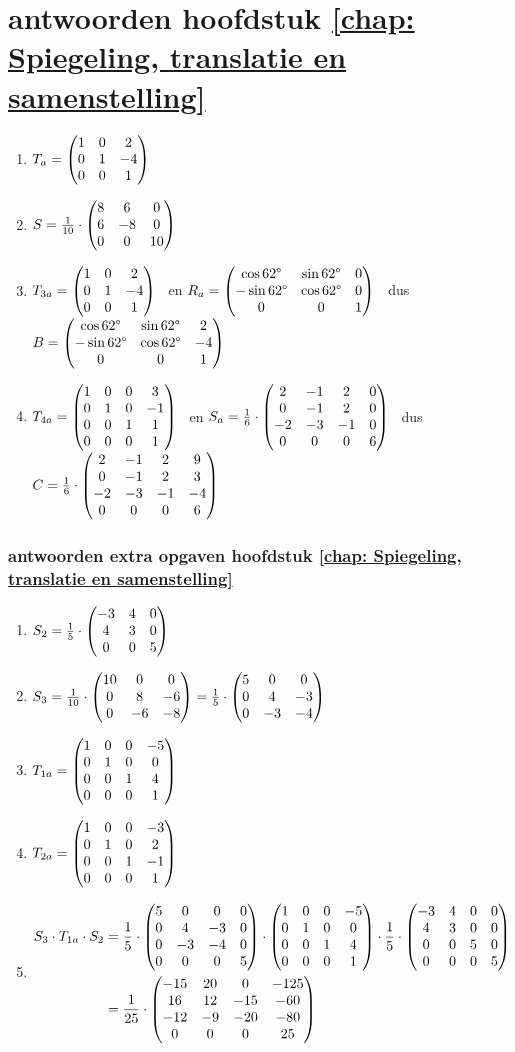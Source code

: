 \section{antwoorden  hoofdstuk \ref{chap: Spiegeling, translatie en samenstelling}}
\begin{enumerate}
	\item $ T_a = \begin{pmatrix} 1&0&2 \\ 0&1&-4 \\ 0&0&1 \end{pmatrix} $ 
	
	\item $   S = \frac{1}{10} \cdot\begin{pmatrix} 8&6&0 \\ 6&-8&0 \\ 0&0&10 \end{pmatrix}  $ 
	
	\item $ T_{3a} = \begin{pmatrix} 1&0&2 \\ 0&1&-4 \\ 0&0&1 \end{pmatrix} $ 
	\ en $ R_a= \begin{pmatrix} \cos 62 \degree &\sin 62 \degree&0 \\ -\sin 62 \degree&\cos 62 \degree&0 \\ 0&0&1 \end{pmatrix} $ 
	\ dus $ B= \begin{pmatrix} \cos 62 \degree &\sin 62 \degree&2 \\ -\sin 62 \degree&\cos 62 \degree&-4 \\ 0&0&1 \end{pmatrix} $ 
	
	
	\item $ T_{4a} = \begin{pmatrix} 1&0&0&3 \\ 0&1&0&-1 \\ 0&0&1&1 \\ 0&0&0&1 \end{pmatrix} $
	\ en $ S_a= \frac{1}{6}\cdot\begin{pmatrix} 2&-1&2&0 \\ 0&-1&2&0 \\ -2&-3&-1&0 \\ 0&0&0&6 \end{pmatrix} $
	\ dus $ C = \frac{1}{6}\cdot \begin{pmatrix} 2&-1&2&9 \\ 0&-1&2&3 \\ -2&-3&-1&-4 \\ 0&0&0&6 \end{pmatrix} $
	
	
\end{enumerate}

\subsubsection{antwoorden extra opgaven hoofdstuk \ref{chap: Spiegeling, translatie en samenstelling}}
\begin{enumerate}
	\item $   S_2 = \frac{1}{5} \cdot\begin{pmatrix} -3&4&0 \\ 4&3&0 \\ 0&0&5 \end{pmatrix}  $ 
	\item $   S_3 = \frac{1}{10} \cdot\begin{pmatrix} 10&0&0 \\ 0&8&-6 \\ 0&-6&-8 \end{pmatrix}  
	= \frac{1}{5} \cdot \begin{pmatrix} 5&0&0 \\ 0&4&-3 \\ 0&-3&-4 \end{pmatrix}  $ 
	
	\item $T_{1a} = \begin{pmatrix} 1&0&0&-5 \\ 0&1&0&0 \\ 0&0&1&4 \\ 0&0&0&1 \end{pmatrix} $
    	\item $ T_{2a} = \begin{pmatrix} 1&0&0&-3 \\ 0&1&0&2 \\ 0&0&1&-1 \\ 0&0&0&1 \end{pmatrix} $
    	\item 
        \begin{align*}
            S_3 \cdot T_{1a} \cdot S_2 &= \frac{1}{5} \cdot
            \begin{pmatrix} 5&0&0&0 \\ 0&4&-3&0 \\ 0&-3&-4&0 \\ 0&0&0&5 \end{pmatrix} \cdot 
        	\begin{pmatrix} 1&0&0&-5 \\ 0&1&0&0 \\ 0&0&1&4 \\ 0&0&0&1 \end{pmatrix} \cdot 
        	\frac{1}{5} \cdot \begin{pmatrix} -3&4&0&0 \\ 4&3&0&0 \\ 0&0&5&0 \\ 0&0&0&5 \end{pmatrix} \\
        	&= \frac{1}{25} \cdot \begin{pmatrix} -15&20&0&-125 \\ 16&12&-15&-60 \\ -12&-9&-20&-80 \\ 0&0&0&25 \end{pmatrix} 
    	\end{align*}
	
\end{enumerate}

